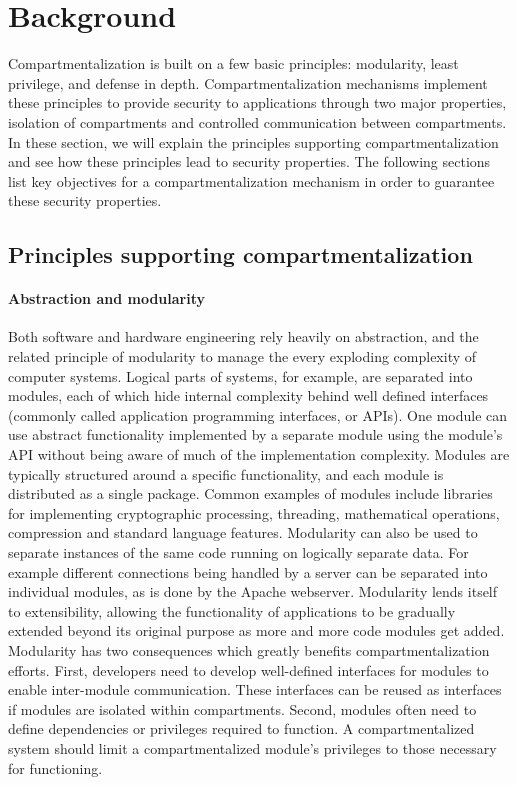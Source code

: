 \section{Background}
\label{sec:seccells:background}

Compartmentalization is built on a few basic principles:
modularity, least privilege, and defense in depth.
Compartmentalization mechanisms implement these principles to provide security
to applications through two major properties, isolation of compartments
and controlled communication between compartments.
In these section, we will explain the principles supporting 
compartmentalization and see how these principles lead to security
properties.
The following sections list key objectives for a compartmentalization
mechanism in order to guarantee these security properties.

\subsection{Principles supporting compartmentalization}
\label{sec:seccells:background:principles}

\paragraph{Abstraction and modularity}
Both software and hardware engineering rely heavily on abstraction, and the
related principle of modularity to manage the every exploding complexity of
computer systems.
Logical parts of systems, for example, are separated into modules, each of 
which hide internal complexity behind well defined interfaces
(commonly called application programming interfaces, or APIs).
One module can use abstract functionality implemented by a separate module
using the module's API without being aware of much of the implementation
complexity.
Modules are typically structured around a specific functionality, and
each module is distributed as a single package.
Common examples of modules include libraries for implementing
cryptographic processing, threading, mathematical operations, compression
and standard language features.
Modularity can also be used to separate instances of the same code running on
logically separate data. 
For example different connections being handled by a server can be separated
into individual modules, as is done by the Apache webserver.
Modularity lends itself to extensibility, allowing the functionality of
applications to be gradually extended beyond its original purpose as more and
more code modules get added.
Modularity has two consequences which greatly benefits compartmentalization
efforts.
First, developers need to develop well-defined interfaces for modules to
enable inter-module communication.
These interfaces can be reused as interfaces if modules are isolated within
compartments.
Second, modules often need to define dependencies or privileges required to 
function.
A compartmentalized system should limit a compartmentalized module's privileges
to those necessary for functioning.

